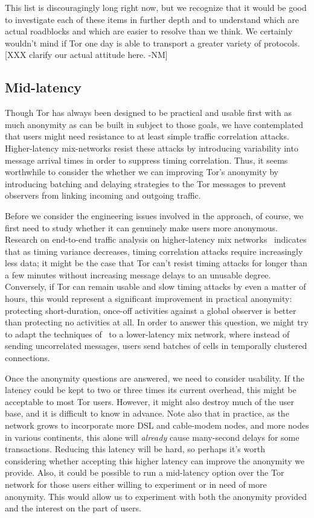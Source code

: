 \documentclass{llncs}
\begin{document}
This list is discouragingly long right now, but we recognize that it
would be good to investigate each of these items in further depth and to
understand which are actual roadblocks and which are easier to resolve
than we think. We certainly wouldn't mind if Tor one day is able to
transport a greater variety of protocols.
[XXX clarify our actual attitude here. -NM]

\subsection{Mid-latency}
\label{subsec:mid-latency}

Though Tor has always been designed to be practical and usable first
with as much anonymity as can be built in subject to those goals, we
have contemplated that users might need resistance to at least simple
traffic correlation attacks.  Higher-latency mix-networks resist these
attacks by introducing variability into message arrival times in order to
suppress timing correlation.  Thus, it seems worthwhile to consider the
whether we can improving Tor's anonymity by introducing batching and delaying
strategies to the Tor messages to prevent observers from linking incoming and
outgoing traffic.

Before we consider the engineering issues involved in the approach, of
course, we first need to study whether it can genuinely make users more
anonymous.  Research on end-to-end traffic analysis on higher-latency mix
networks~\cite{e2e-traffic} indicates that as timing variance decreases,
timing correlation attacks require increasingly less data; it might be the
case that Tor can't resist timing attacks for longer than a few minutes
without increasing message delays to an unusable degree.  Conversely, if Tor
can remain usable and slow timing attacks by even a matter of hours, this
would represent a significant improvement in practical anonymity: protecting
short-duration, once-off activities against a global observer is better than
protecting no activities at all.  In order to answer this question, we might
try to adapt the techniques of~\cite{e2e-traffic} to a lower-latency mix
network, where instead of sending uncorrelated messages, users send batches
of cells in temporally clustered connections.

Once the anonymity questions are answered, we need to consider usability.  If
the latency could be kept to two or three times its current overhead, this
might be acceptable to most Tor users. However, it might also destroy much of
the user base, and it is difficult to know in advance.  Note also that in
practice, as the network grows to incorporate more DSL and cable-modem nodes,
and more nodes in various continents, this alone will \emph{already} cause
many-second delays for some transactions.  Reducing this latency will be
hard, so perhaps it's worth considering whether accepting this higher latency
can improve the anonymity we provide.  Also, it could be possible to
run a mid-latency option over the Tor network for those
users either willing to experiment or in need of more
anonymity.  This would allow us to experiment with both
the anonymity provided and the interest on the part of users.
\end{document}
